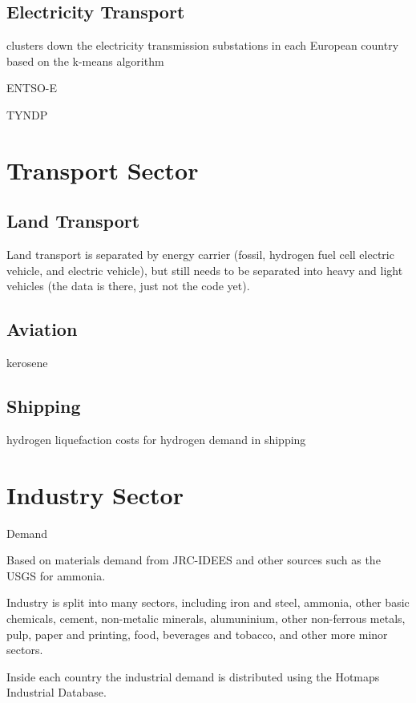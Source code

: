 \subsection{Electricity Transport}

clusters down the electricity transmission substations in each European country
based on the k-means algorithm

ENTSO-E

TYNDP

\section{Transport Sector}

\subsection{Land Transport}

Land transport is separated by energy carrier (fossil, hydrogen fuel cell
electric vehicle, and electric vehicle), but still needs to be separated into
heavy and light vehicles (the data is there, just not the code yet).

\subsection{Aviation}

kerosene

\subsection{Shipping}

hydrogen liquefaction costs for hydrogen demand in shipping

\section{Industry Sector}

Demand

Based on materials demand from JRC-IDEES and other sources such as the USGS for ammonia.

Industry is split into many sectors, including iron and steel, ammonia, other basic chemicals, cement, non-metalic minerals, alumuninium, other non-ferrous metals, pulp, paper and printing, food, beverages and tobacco, and other more minor sectors.

Inside each country the industrial demand is distributed using the Hotmaps Industrial Database.

